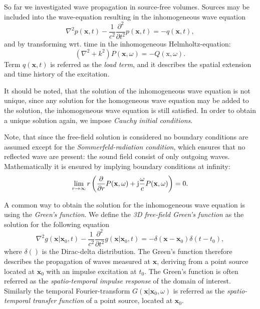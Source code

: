 So far we investigated wave propagation in source-free volumes. Sources may be included into the wave-equation resulting in the inhomogeneous wave equation
\begin{equation}
\nabla^2 p(\mathbf{x},t) -\frac{1}{c^2}\frac{\partial^2}{\partial t^2}p(\mathbf{x},t) = -q(\mathbf{x},t),
\label{Eq:Theory:Inhomogene_wave_eq_time_domain}
\end{equation}
and by transforming wrt. time in the inhomogeneous Helmholtz-equation:
\begin{equation}
(\nabla^2 + k^2 ) P(\mathbf{x},\omega ) = -Q(\mathrm{x},\omega).
\end{equation}
Term $q(\mathbf{x},t)$ is referred as the \emph{load term}, and it describes the spatial extension and time history of the excitation.

It should be noted, that the solution of the inhomogeneous wave equation is not unique, since any solution for the homogeneous wave equation may be added to the solution, the inhomogeneous wave equation is still satisfied. In order to obtain a unique solution again, we impose \emph{Cauchy initial conditions}.

Note, that since the free-field solution is considered no boundary conditions are assumed except for the \emph{Sommerfeld-radiation condition}, which ensures that no reflected wave are present: the sound field consist of only outgoing waves. Mathematically it is ensured by implying boundary conditions at infinity:
\begin{equation}
\lim_{r \rightarrow \infty} r \left( \frac{\partial}{\partial r}P(\mathbf{x},\omega) +\mathrm{j} \frac{\omega}{c}P(\mathbf{x},\omega) \right) = 0.
\label{Eq:Theory:Sommerfeld_radiation_condition}
\end{equation}

\vspace{3mm}
A common way to obtain the solution for the inhomogeneous wave equation is using the \emph{Green's function}. We define the \emph{3D free-field Green's function} as the solution for the following equation \cite{Gumerov2004, Williams1999}
\begin{equation}
\nabla^2 g(\mathbf{x}|\mathbf{x}_0,t) -\frac{1}{c^2}\frac{\partial^2}{\partial t^2} g(\mathbf{x}|\mathbf{x}_0,t) = -\delta\left( \mathbf{x} - \mathbf{x}_0 \right)\delta\left( t - t_0 \right),
\label{Eq:Theory:Green_function_def}
\end{equation}
where $\delta()$ is the Dirac-delta distribution. The Green's function therefore describes the propagation of waves measured at $\mathbf{x}$, deriving from a point source located at $\mathbf{x}_0$ with an impulse excitation at $t_0$. The Green's function is often referred as the \emph{spatio-temporal impulse response} of the domain of interest.
Similarly the temporal Fourier-transform $G(\mathbf{x}|\mathbf{x}_0,\omega)$ is referred as the \emph{spatio-temporal transfer function} of a point source, located at $\mathbf{x}_0$. 

